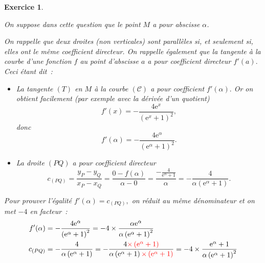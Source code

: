 \documentclass[10pt]{article}
\newtheorem{exo}{Exercice}
\begin{document}
\begin{exo}
\begin{enumerate}
\begin{multicols}{2}

On suppose dans cette question que le point $M$ a pour abscisse $\alpha$.

\medskip

On rappelle que deux droites (non verticales) sont parallèles si, et seulement si, elles ont le même coefficient directeur. On rappelle également que la tangente à la courbe d'une fonction $f$ au point d'abscisse $a$ a pour coefficient directeur $f'(a).$ Ceci étant dit~:


\begin{itemize}
\item[\textbullet] La tangente $(T)$ en $M$ à la courbe $(\mathcal{C})$ a pour coefficient
$f'(\alpha).$ Or on obtient facilement (par exemple avec la dérivée d'un quotient)
\[f'(x)=-\frac{4\text{e}^x}{\left(\text{e}^x+1\right)^2},\]
donc
\[f'(\alpha)=-\frac{4\text{e}^\alpha}{\left(\text{e}^{\alpha}+1\right)^2}.\]
\item[\textbullet] La droite $(PQ)$ a pour coefficient directeur
\[
c_{(PQ)}=\frac{y_P-y_Q}{x_P-x_Q}=\frac{0-f(\alpha)}{\alpha-0}=\frac{-\frac{4}{\text{e}^{\alpha}+1}}{\alpha}=-\frac{4}{\alpha\left(\text{e}^{\alpha}+1\right)}.
\]
\end{itemize}

\columnbreak

Pour prouver l'égalité $f'(\alpha)=c_{(PQ)},$ on réduit au même dénominateur et on met $-4$ en facteur~:
\begin{align*}
f'(\alpha)&=-\frac{4\text{e}^\alpha}{\left(\text{e}^{\alpha}+1\right)^2}=-4\times \frac{\alpha\text{e}^\alpha}{\alpha\left(\text{e}^{\alpha}+1\right)^2}
\\ c_{(PQ)}&=-\frac{4}{\alpha\left(\text{e}^{\alpha}+1\right)}=-\frac{4\textcolor{red}{\times\left(\text{e}^{\alpha}+1\right)}}{\alpha\left(\text{e}^{\alpha}+1\right)\textcolor{red}{\times\left(\text{e}^{\alpha}+1\right)}}=-4\times \frac{\text{e}^\alpha+1}{\alpha\left(\text{e}^{\alpha}+1\right)^2}
\end{align*}


\end{multicols}
\end{enumerate}
\end{exo}
\end{document}

